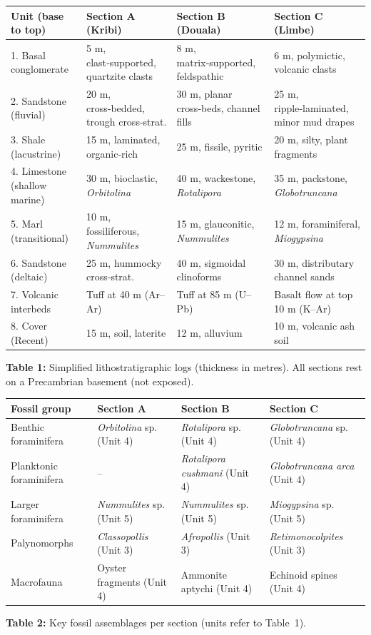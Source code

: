 \documentclass[11pt]{article}
\begin{document}
\begin{experience}
\begin{center}
\begin{tabularx}{\linewidth}{|l|X|X|X|}
\hline
\rowcolor{popblueL}
\textbf{Unit (base to top)} & \textbf{Section A (Kribi)} & \textbf{Section B (Douala)} & \textbf{Section C (Limbe)} \\
\hline
1. Basal conglomerate & 5 m, clast‑supported, quartzite clasts & 8 m, matrix‑supported, feldspathic & 6 m, polymictic, volcanic clasts \\
2. Sandstone (fluvial) & 20 m, cross‑bedded, trough cross‑strat. & 30 m, planar cross‑beds, channel fills & 25 m, ripple‑laminated, minor mud drapes \\
3. Shale (lacustrine) & 15 m, laminated, organic‑rich & 25 m, fissile, pyritic & 20 m, silty, plant fragments \\
4. Limestone (shallow marine) & 30 m, bioclastic, \emph{Orbitolina} & 40 m, wackestone, \emph{Rotalipora} & 35 m, packstone, \emph{Globotruncana} \\
5. Marl (transitional) & 10 m, fossiliferous, \emph{Nummulites} & 15 m, glauconitic, \emph{Nummulites} & 12 m, foraminiferal, \emph{Miogypsina} \\
6. Sandstone (deltaic) & 25 m, hummocky cross‑strat. & 40 m, sigmoidal clinoforms & 30 m, distributary channel sands \\
7. Volcanic interbeds & Tuff at 40 m (Ar–Ar) & Tuff at 85 m (U–Pb) & Basalt flow at top 10 m (K–Ar) \\
8. Cover (Recent) & 15 m, soil, laterite & 12 m, alluvium & 10 m, volcanic ash soil \\
\hline
\end{tabularx}
\end{center}
\textbf{Table 1:} Simplified lithostratigraphic logs (thickness in metres). All sections rest on a Precambrian basement (not exposed).

\begin{center}
\begin{tabularx}{\linewidth}{|l|X|X|X|}
\hline
\rowcolor{popblueL}
\textbf{Fossil group} & \textbf{Section A} & \textbf{Section B} & \textbf{Section C} \\
\hline
Benthic foraminifera & \emph{Orbitolina} sp. (Unit 4) & \emph{Rotalipora} sp. (Unit 4) & \emph{Globotruncana} sp. (Unit 4) \\
Planktonic foraminifera & – & \emph{Rotalipora cushmani} (Unit 4) & \emph{Globotruncana arca} (Unit 4) \\
Larger foraminifera & \emph{Nummulites} sp. (Unit 5) & \emph{Nummulites} sp. (Unit 5) & \emph{Miogypsina} sp. (Unit 5) \\
Palynomorphs & \emph{Classopollis} (Unit 3) & \emph{Afropollis} (Unit 3) & \emph{Retimonocolpites} (Unit 3) \\
Macrofauna & Oyster fragments (Unit 4) & Ammonite aptychi (Unit 4) & Echinoid spines (Unit 4) \\
\hline
\end{tabularx}
\end{center}
\textbf{Table 2:} Key fossil assemblages per section (units refer to Table~1).


\end{experience}
\end{document}
